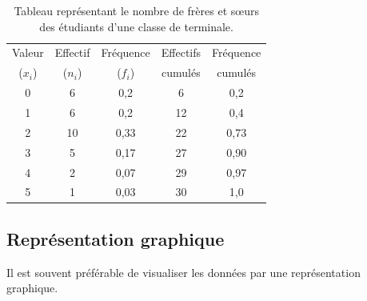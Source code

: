 \begin{defi}
\begin{ex}
                        \begin{table}[H]
                        \centering
                        \begin{tabular}{c|c|c|c|c}
                        Valeur   & Effectif & Fr\'equence & Effectifs & Fr\'equence \\
                        ($x_i$)  & ($n_i$)  &  ($f_i$)    & cumul\'es &  cumul\'es  \\
                        \hline
                              0        &       6          &       0,2           &       6             &         0,2           \\
                              1        &       6          &       0,2           &      12             &         0,4           \\
                              2        &      10          &       0,33          &      22             &         0,73          \\
                              3        &       5          &       0,17          &      27             &         0,90          \\
                              4        &       2          &       0,07          &      29             &         0,97          \\
                              5        &       1          &       0,03          &      30             &         1,0           \\
                        \end{tabular}
                        \caption{Tableau repr\'esentant le
                                 nombre de fr\`eres et s\oe urs des \'etudiants d'une classe de terminale.}
                        \label{tab:variable discret}
                        \end{table}
                  \end{ex}
            \end{defi}
            \subsection{Repr\'esentation graphique}
                  Il est souvent pr\'ef\'erable de visualiser les donn\'ees par une repr\'esentation graphique.
